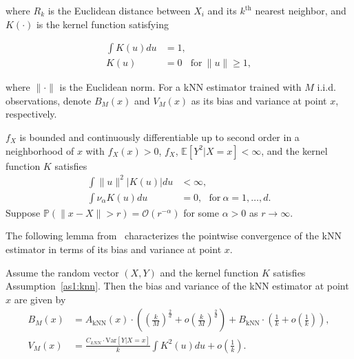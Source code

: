 where $R_k$ is the Euclidean distance between $X_i$ and its $k^{\text{th}}$ nearest neighbor, and $K(\cdot)$ is the kernel function satisfying 

\begin{align*}
    \int K(u) du & = 1, \\
    K(u) &= 0 ~~~ ~\text{for}~ \|u\| \geq 1,
\end{align*}

where $\|\cdot\|$ is the Euclidean norm.
For a kNN estimator trained with $M$ i.i.d. observations, denote $B_M(x)$ and $V_M(x)$ as its bias and variance at point $x$, respectively.

\begin{assumption} \label{as1:knn}
    $f_X$ is bounded and continuously differentiable up to second order in a neighborhood of $x$ with $f_X(x) > 0$, $f_X$, $\mathbb{E} \left[ Y^2| X = x \right] < \infty$, and the kernel function $K$ satisfies
    \begin{align*}
        \int \|u\|^2  |K(u)| du & < \infty, \\
        \int \nu_\alpha K(u) du & = 0, ~~~ \text{for}~ \alpha = 1, \dots, d.
    \end{align*}
    Suppose $\mathbb{P}(\|x - X\| > r) = \mathcal{O}(r^{-\alpha})$ for some $\alpha > 0$ as $r \rightarrow \infty$.
\end{assumption}

The following lemma from~\cite{mack1981local} characterizes the pointwise convergence of the kNN estimator in terms of its bias and variance at point $x$.

\begin{lemma}
    Assume the random vector $(X, Y)$ and the kernel function $K$ satisfies Assumption~\ref{as1:knn}. Then the bias and variance of the kNN estimator at point $x$ are given by
    \begin{align*}
        B_M(x) & = A_{\text{kNN}}(x) \cdot \left( \left( \frac{k}{M} \right)^\frac{2}{d} + o \left( \frac{k}{M} \right)^\frac{2}{d} \right) + B_{\text{kNN}} \cdot \left(\frac{1}{k} + o\left(\frac{1}{k}\right)\right), \\
        V_M(x) & = \frac{C_{kNN} \cdot \text{Var}[Y| X = x]}{k} \int K^2(u) du + o\left(\frac{1}{k}\right).
    \end{align*}
\end{lemma}

